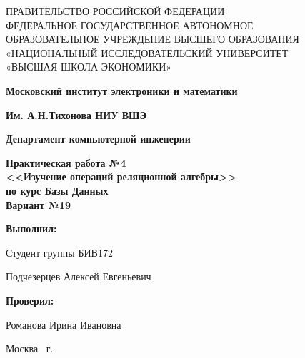 \begin{titlepage}
	\begin{center}
		ПРАВИТЕЛЬСТВО РОССИЙСКОЙ ФЕДЕРАЦИИ \\
 		ФЕДЕРАЛЬНОЕ  ГОСУДАРСТВЕННОЕ АВТОНОМНОЕ \\
		ОБРАЗОВАТЕЛЬНОЕ УЧРЕЖДЕНИЕ ВЫСШЕГО ОБРАЗОВАНИЯ\\
		«НАЦИОНАЛЬНЫЙ ИССЛЕДОВАТЕЛЬСКИЙ УНИВЕРСИТЕТ\\
		«ВЫСШАЯ ШКОЛА ЭКОНОМИКИ»
	\end{center}
	
	\begin{center}
		\textbf{Московский институт электроники и математики}
		
		\textbf{Им. А.Н.Тихонова НИУ ВШЭ}
		
		\vspace{2ex}
		
		\textbf{Департамент компьютерной инженерии}
	\end{center}
	\vspace{1ex}	
	
	\vspace{1ex}
	\begin{center}
		\textbf{Практическая работа №4 \\
			<<Изучение операций реляционной алгебры>> \\
			по курс	Базы Данных\\
			Вариант №19
	}
	\end{center}	

	\vspace{2ex}
	\vfill
	
	\vspace{2ex}
	
	\begin{flushright}
		\textbf{Выполнил:}
		
		\vspace{2ex}
		
		Студент группы БИВ172
		
		\vspace{2ex}
		
		Подчезерцев Алексей Евгеньевич
		
		\vspace{2ex}
		
		\textbf{Проверил:}
		
		\vspace{2ex}
		
		Романова Ирина Ивановна
	\end{flushright}

	\vspace{5ex}
	\begin{center}
		Москва \the\year \, г.
	\end{center}
	
\end{titlepage}
\addtocounter{page}{1}